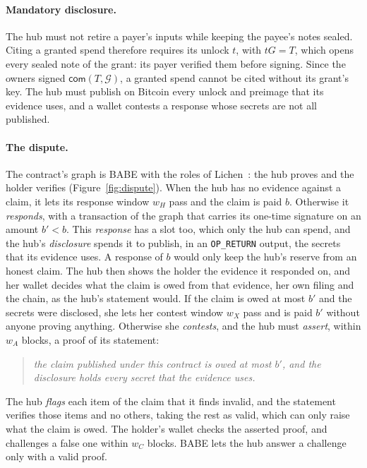 \documentclass[11pt]{article}
\newcommand{\wH}{w_H}
\newcommand{\wA}{w_A}
\newcommand{\wC}{w_C}
\newcommand{\wX}{w_X}
\newcommand{\bresp}{b'}
\newcommand{\G}{\mathcal{G}}
\begin{document}
\paragraph{Mandatory disclosure.} The hub must not retire a payer's inputs while keeping the payee's notes sealed. Citing a granted spend therefore requires its unlock $t$, with $tG=T$, which opens every sealed note of the grant: its payer verified them before signing. Since the owners signed $\mathsf{com}(T,\G)$, a granted spend cannot be cited without its grant's key. The hub must publish on Bitcoin every unlock and preimage that its evidence uses, and a wallet contests a response whose secrets are not all published.

\paragraph{The dispute.} The contract's graph is BABE with the roles of Lichen~\cite[App.~A]{lichen}: the hub proves and the holder verifies (Figure~\ref{fig:dispute}). When the hub has no evidence against a claim, it lets its response window $\wH$ pass and the claim is paid $b$. Otherwise it \emph{responds}, with a transaction of the graph that carries its one-time signature on an amount $\bresp<b$. This \emph{response} has a slot too, which only the hub can spend, and the hub's \emph{disclosure} spends it to publish, in an \texttt{OP\_RETURN} output, the secrets that its evidence uses. A response of $b$ would only keep the hub's reserve from an honest claim. The hub then shows the holder the evidence it responded on, and her wallet decides what the claim is owed from that evidence, her own filing and the chain, as the hub's statement would. If the claim is owed at most $\bresp$ and the secrets were disclosed, she lets her contest window $\wX$ pass and is paid $\bresp$ without anyone proving anything. Otherwise she \emph{contests}, and the hub must \emph{assert}, within $\wA$ blocks, a proof of its statement:
\begin{quote}
\emph{the claim published under this contract is owed at most $\bresp$, and the disclosure holds every secret that the evidence uses.}
\end{quote}
The hub \emph{flags} each item of the claim that it finds invalid, and the statement verifies those items and no others, taking the rest as valid, which can only raise what the claim is owed. The holder's wallet checks the asserted proof, and challenges a false one within $\wC$ blocks. BABE lets the hub answer a challenge only with a valid proof.
\end{document}

